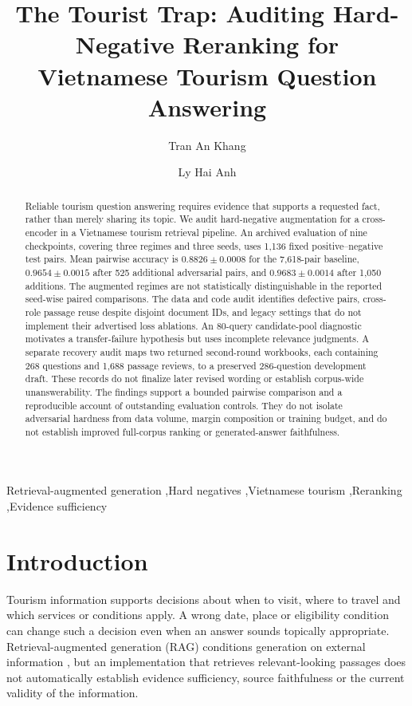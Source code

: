\documentclass[preprint,12pt,authoryear]{elsarticle}
\begin{document}
\begin{frontmatter}
\title{The Tourist Trap: Auditing Hard-Negative Reranking for Vietnamese Tourism Question Answering}
\author[aff1]{Tran An Khang}
\author[aff1]{Ly Hai Anh}

\begin{abstract}
Reliable tourism question answering requires evidence that supports a requested
fact, rather than merely sharing its topic. We audit hard-negative augmentation
for a cross-encoder in a Vietnamese tourism retrieval pipeline. An archived
evaluation of nine checkpoints, covering three regimes and three seeds, uses
1,136 fixed positive--negative test pairs. Mean pairwise accuracy is
$0.8826\pm0.0008$ for the 7,618-pair baseline, $0.9654\pm0.0015$ after 525
additional adversarial pairs, and $0.9683\pm0.0014$ after 1,050 additions.
The augmented regimes are not statistically distinguishable in the reported
seed-wise paired comparisons. The data and code audit identifies defective
pairs, cross-role passage reuse despite disjoint document IDs, and legacy
settings that do not implement their advertised loss ablations. An 80-query
candidate-pool diagnostic motivates a transfer-failure hypothesis but uses
incomplete relevance judgments. A separate recovery audit maps two returned
second-round workbooks, each containing 268 questions and 1,688 passage reviews,
to a preserved 286-question development draft. These records do not finalize
later revised wording or establish corpus-wide unanswerability. The findings
support a bounded pairwise comparison and a reproducible account of outstanding
evaluation controls. They do not isolate adversarial hardness from data volume,
margin composition or training budget, and do not establish improved full-corpus
ranking or generated-answer faithfulness.
\end{abstract}
\begin{keyword}
Retrieval-augmented generation \sep Hard negatives \sep Vietnamese tourism \sep Reranking \sep Evidence sufficiency
\end{keyword}
\end{frontmatter}

\section{Introduction}
Tourism information supports decisions about when to visit, where to travel and
which services or conditions apply. A wrong date, place or eligibility condition
can change such a decision even when an answer sounds topically appropriate.
Retrieval-augmented generation (RAG) conditions generation on external
information \citep{lewis2020retrieval}, but an implementation that retrieves
relevant-looking passages does not automatically establish evidence sufficiency,
source faithfulness or the current validity of the information.
\end{document}
